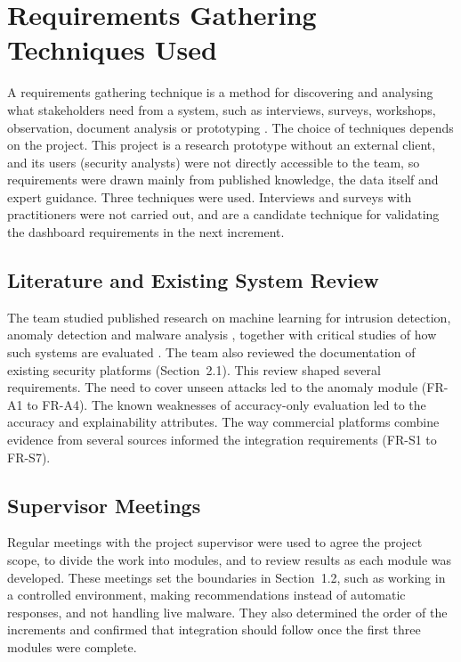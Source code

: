 \section{Requirements Gathering Techniques Used}
\label{sec:req-gathering}

A requirements gathering technique is a method for discovering and analysing what stakeholders need from a system, such as interviews, surveys, workshops, observation, document analysis or prototyping \cite{sommerville2016se}. The choice of techniques depends on the project. This project is a research prototype without an external client, and its users (security analysts) were not directly accessible to the team, so requirements were drawn mainly from published knowledge, the data itself and expert guidance. Three techniques were used. Interviews and surveys with practitioners were not carried out, and are a candidate technique for validating the dashboard requirements in the next increment.

\subsection{Literature and Existing System Review}

The team studied published research on machine learning for intrusion detection, anomaly detection and malware analysis \cite{buczak2016survey,chandola2009anomaly,ucci2019malware}, together with critical studies of how such systems are evaluated \cite{sommer2010outside,arp2022dos}. The team also reviewed the documentation of existing security platforms (Section~2.1). This review shaped several requirements. The need to cover unseen attacks led to the anomaly module (FR-A1 to FR-A4). The known weaknesses of accuracy-only evaluation led to the accuracy and explainability attributes. The way commercial platforms combine evidence from several sources informed the integration requirements (FR-S1 to FR-S7).

\subsection{Supervisor Meetings}

Regular meetings with the project supervisor were used to agree the project scope, to divide the work into modules, and to review results as each module was developed. These meetings set the boundaries in Section~1.2, such as working in a controlled environment, making recommendations instead of automatic responses, and not handling live malware. They also determined the order of the increments and confirmed that integration should follow once the first three modules were complete.

